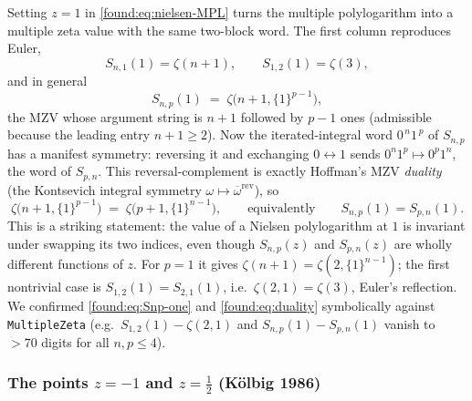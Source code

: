 Setting $z=1$ in \eqref{found:eq:nielsen-MPL} turns the multiple polylogarithm into a multiple zeta value with the same two-block word. The first column reproduces Euler,
\begin{equation}\label{found:eq:Snp-one-col}
  S_{n,1}(1)=\zeta(n+1),\qquad S_{1,2}(1)=\zeta(3),
\end{equation}
and in general
\begin{equation}\label{found:eq:Snp-one}
  S_{n,p}(1)\;=\;\zeta\bigl(n+1,\{1\}^{p-1}\bigr),
\end{equation}
the MZV whose argument string is $n+1$ followed by $p-1$ ones (admissible because the leading entry $n+1\ge2$). Now the iterated-integral word $0^{\,n}1^{\,p}$ of $S_{n,p}$ has a manifest symmetry: reversing it and exchanging $0\leftrightarrow1$ sends $0^{n}1^{p}\mapsto 0^{p}1^{n}$, the word of $S_{p,n}$. This reversal-complement is exactly Hoffman's MZV \emph{duality} (the Kontsevich integral symmetry $\omega\mapsto\overline{\omega}^{\mathrm{rev}}$), so
\begin{equation}\label{found:eq:duality}
  \boxed{\;\zeta\bigl(n+1,\{1\}^{p-1}\bigr)\;=\;\zeta\bigl(p+1,\{1\}^{n-1}\bigr),\qquad\text{equivalently}\qquad S_{n,p}(1)=S_{p,n}(1).\;}
\end{equation}
This is a striking statement: the value of a Nielsen polylogarithm at $1$ is invariant under swapping its two indices, even though $S_{n,p}(z)$ and $S_{p,n}(z)$ are wholly different functions of $z$. For $p=1$ it gives $\zeta(n+1)=\zeta(2,\{1\}^{n-1})$; the first nontrivial case is $S_{1,2}(1)=S_{2,1}(1)$, i.e.\ $\zeta(2,1)=\zeta(3)$, Euler's reflection. We confirmed \eqref{found:eq:Snp-one} and \eqref{found:eq:duality} symbolically against \texttt{MultipleZeta} (e.g.\ $S_{1,2}(1)-\zeta(2,1)$ and $S_{n,p}(1)-S_{p,n}(1)$ vanish to $>70$ digits for all $n,p\le4$).

\subsubsection*{The points $z=-1$ and $z=\tfrac12$ (Kölbig 1986)}

